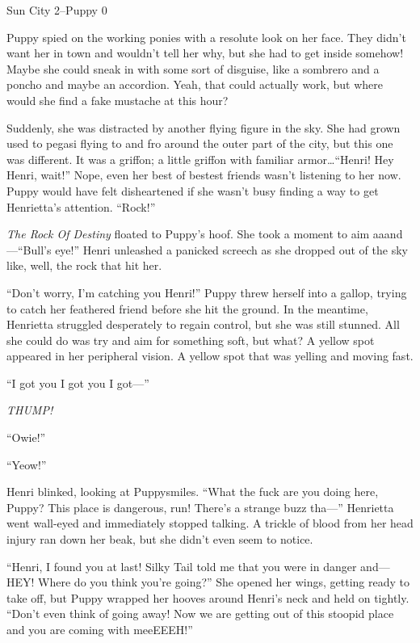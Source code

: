 \begin{center}
	Sun City 2--Puppy 0
\end{center}

\horizonline


Puppy spied on the working ponies with a resolute look on her face. They didn't want her in town and wouldn't tell her why, but she had to get inside somehow! Maybe she could sneak in with some sort of disguise, like a sombrero and a poncho and maybe an accordion. Yeah, that could actually work, but where would she find a fake mustache at this hour?

Suddenly, she was distracted by another flying figure in the sky. She had grown used to pegasi flying to and fro around the outer part of the city, but this one was different. It was a griffon; a little griffon with familiar armor\dots ``Henri! Hey Henri, wait!'' Nope, even her best of bestest friends wasn't listening to her now. Puppy would have felt disheartened if she wasn't busy finding a way to get Henrietta's attention. ``Rock!''

\emph{The Rock Of Destiny}\/ floated to Puppy's hoof. She took a moment to aim aaand---``Bull's eye!'' Henri unleashed a panicked screech as she dropped out of the sky like, well, the rock that hit her.

``Don't worry, I'm catching you Henri!'' Puppy threw herself into a gallop, trying to catch her feathered friend before she hit the ground. In the meantime, Henrietta struggled desperately to regain control, but she was still stunned. All she could do was try and aim for something soft, but what? A yellow spot appeared in her peripheral vision. A yellow spot that was yelling and moving fast.

``I got you I got you I got---''

\emph{THUMP!}

``Owie!''

``Yeow!''

Henri blinked, looking at Puppysmiles. ``What the fuck are you doing here, Puppy? This place is dangerous, run! There's a strange buzz tha---'' Henrietta went wall-eyed and immediately stopped talking. A trickle of blood from her head injury ran down her beak, but she didn't even seem to notice.

``Henri, I found you at last! Silky Tail told me that you were in danger and---HEY! Where do you think you're going?'' She opened her wings, getting ready to take off, but Puppy wrapped her hooves around Henri's neck and held on tightly. ``Don't even think of going away! Now we are getting out of this stoopid place and you are coming with meeEEEH!''


